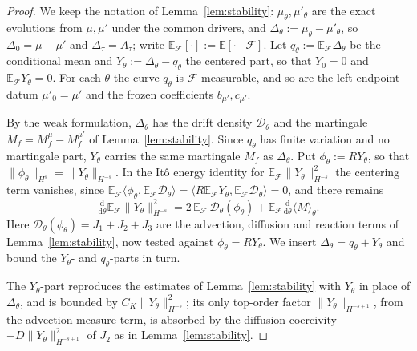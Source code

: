 \documentclass[a4paper,fleqn]{cas-sc}
\theoremstyle{definition}
\theoremstyle{remark}
\begin{document}
\begin{proof}
We keep the notation of Lemma~\ref{lem:stability}: $\mu_\theta,\mu'_\theta$ are the exact
evolutions from $\mu,\mu'$ under the common drivers, and
$\Delta_\theta:=\mu_\theta-\mu'_\theta$, so $\Delta_0=\mu-\mu'$ and $\Delta_\tau=A_\tau$;
write $\mathbb E_{\mathcal F}[\cdot]:=\mathbb E[\cdot\mid\mathcal F]$. Let
$q_\theta:=\mathbb E_{\mathcal F}\Delta_\theta$ be the conditional mean and
$Y_\theta:=\Delta_\theta-q_\theta$ the centered part, so that $Y_0=0$ and
$\mathbb E_{\mathcal F}Y_\theta=0$. For each $\theta$ the curve $q_\theta$ is
$\mathcal F$-measurable, and so are the left-endpoint datum $\mu'_0=\mu'$ and the frozen
coefficients $b_{\mu'},c_{\mu'}$.

By the weak formulation, $\Delta_\theta$ has the drift density $\mathcal D_\theta$ and the
martingale $M_f=M^\mu_f-M^{\mu'}_f$ of Lemma~\ref{lem:stability}. Since $q_\theta$ has
finite variation and no martingale part, $Y_\theta$ carries the same martingale $M_f$ as
$\Delta_\theta$. Put $\phi_\theta:=RY_\theta$, so that
$\|\phi_\theta\|_{H^s}=\|Y_\theta\|_{H^{-s}}$. In the It\^o energy identity for
$\mathbb E_{\mathcal F}\|Y_\theta\|_{H^{-s}}^2$ the centering term vanishes, since
$\mathbb E_{\mathcal F}\langle\phi_\theta,\mathbb E_{\mathcal F}\mathcal D_\theta\rangle
=\langle R\mathbb E_{\mathcal F}Y_\theta,\mathbb E_{\mathcal F}\mathcal D_\theta\rangle=0$,
and there remains
\begin{equation}\label{eq:var-energy}
\tfrac{\mathrm d}{\mathrm d\theta}\mathbb E_{\mathcal F}\|Y_\theta\|_{H^{-s}}^2
=2\,\mathbb E_{\mathcal F}\,\mathcal D_\theta(\phi_\theta)
+\mathbb E_{\mathcal F}\tfrac{\mathrm d}{\mathrm d\theta}\langle M\rangle_\theta .
\end{equation}
Here $\mathcal D_\theta(\phi_\theta)=J_1+J_2+J_3$ are the advection, diffusion and reaction
terms of Lemma~\ref{lem:stability}, now tested against $\phi_\theta=RY_\theta$. We insert
$\Delta_\theta=q_\theta+Y_\theta$ and bound the $Y_\theta$- and $q_\theta$-parts in turn.

The $Y_\theta$-part reproduces the estimates of Lemma~\ref{lem:stability} with $Y_\theta$
in place of $\Delta_\theta$, and is bounded by $C_K\|Y_\theta\|_{H^{-s}}^2$; its only
top-order factor $\|Y_\theta\|_{H^{-s+1}}$, from the advection measure term, is absorbed by
the diffusion coercivity $-D\|Y_\theta\|_{H^{-s+1}}^2$ of $J_2$ as in
Lemma~\ref{lem:stability}.


\end{proof}
\end{document}
